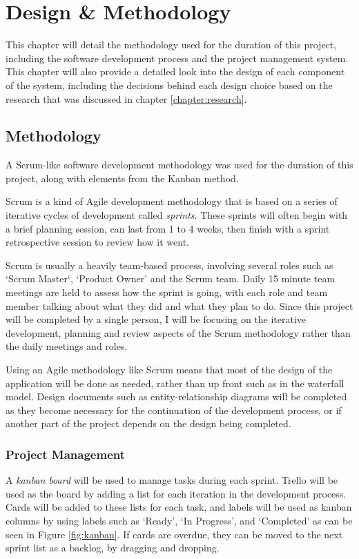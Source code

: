 \chapter{Design \& Methodology}
\label{chapter:design}

This chapter will detail the methodology used for the duration of this project, including the software development process and the project management system. This chapter will also provide a detailed look into the design of each component of the system, including the decisions behind each design choice based on the research that was discussed in chapter \ref{chapter:research}.

\section{Methodology}
\label{sec:methodology}
A Scrum-like software development methodology was used for the duration of this project, along with elements from the Kanban method.

Scrum is a kind of Agile development methodology that is based on a series of iterative cycles of development called \emph{sprints}. These sprints will often begin with a brief planning session, can last from 1 to 4 weeks, then finish with a sprint retrospective session to review how it went.\cite{scrummethodology}

Scrum is usually a heavily team-based process, involving several roles such as `Scrum Master`, `Product Owner' and the Scrum team. Daily 15 minute team meetings are held to assess how the sprint is going, with each role and team member talking about what they did and what they plan to do.\cite{scrummethodology} Since this project will be completed by a single person, I will be focusing on the iterative development, planning and review aspects of the Scrum methodology rather than the daily meetings and roles.

Using an Agile methodology like Scrum means that most of the design of the application will be done as needed, rather than up front such as in the waterfall model. Design documents such as entity-relationship diagrams will be completed as they become necessary for the continuation of the development process, or if another part of the project depends on the design being completed.

\subsection{Project Management}
A \emph{kanban board} will be used to manage tasks during each sprint.\cite{whatiskanban} Trello will be used as the board by adding a list for each iteration in the development process.\cite{trello} Cards will be added to these lists for each task, and labels will be used as kanban columns by using labels such as `Ready', `In Progress', and `Completed' as can be seen in Figure \ref{fig:kanban}. If cards are overdue, they can be moved to the next sprint list as a backlog, by dragging and dropping.

